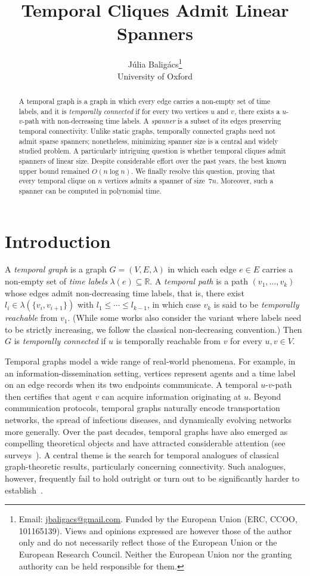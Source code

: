 \documentclass[11pt, letterpaper]{article}
\title{Temporal Cliques Admit Linear Spanners}
\author{Júlia Baligács\thanks{Email: \href{mailto:jbaligacs@gmail.com}{jbaligacs@gmail.com}. Funded by the European Union (ERC, CCOO, 101165139).
Views and opinions expressed are however those of the author only and do not necessarily reflect those of the European Union or the European Research Council. Neither the European Union nor the granting authority can be held responsible for them.}
\vspace{2mm}\\ University of Oxford}
\date{}
\theoremstyle{definition}
\theoremstyle{plain}
\begin{document}
\maketitle


\begin{abstract}
A temporal graph is a graph in which every edge carries a non-empty set of time labels, and it is \emph{temporally connected} if for every two vertices $u$ and $v$, there exists a $u$-$v$-path with non-decreasing time labels. A \emph{spanner} is a subset of its edges preserving temporal connectivity.
Unlike static graphs, temporally connected graphs need not admit sparse spanners; nonetheless, minimizing spanner size is a central and widely studied problem.
A particularly intriguing question is whether temporal cliques admit spanners of linear size.
Despite considerable effort over the past years, the best known upper bound remained $O(n \log n)$.
We finally resolve this question, proving that every temporal clique on $n$ vertices admits a spanner of size~$7n$.
Moreover, such a spanner can be computed in polynomial time.
\end{abstract}



\section{Introduction}

A \emph{temporal graph} is a graph $G=(V,E,\lambda)$ in which each edge $e\in E$
carries a non-empty set of \emph{time labels} $\lambda(e)\subseteq\mathbb{R}$.
A \emph{temporal path} is a path $(v_1,\dots,v_k)$ whose edges admit non-decreasing time labels, that is, there exist~$l_i\in\lambda(\{v_i,v_{i+1}\})$ with $l_1\leq\cdots\leq l_{k-1}$, in which case $v_k$ is said to be \emph{temporally reachable} from $v_1$.
(While some works also consider the variant where labels need to be strictly increasing, we follow the classical non-decreasing convention.)
Then $G$ is \emph{temporally connected} if $u$ is temporally reachable from $v$ for every $u,v\in V$.

Temporal graphs model a wide range of real-world phenomena.
For example, in an information-dissemination setting, vertices represent agents and a time label on an edge records when its two endpoints communicate. 
A temporal $u$-$v$-path then certifies that agent $v$ can acquire information originating at $u$.
Beyond communication protocols, temporal graphs naturally encode transportation networks, the spread of infectious diseases, and dynamically evolving networks more generally.
Over the past decades, temporal graphs have also emerged as compelling theoretical objects and have attracted considerable attention (see surveys~\cite{Michail16, CasteigtsSurvey}).
A central theme is the search for temporal analogues of classical graph-theoretic results, particularly concerning connectivity.
Such analogues, however, frequently fail to hold outright or turn out to be significantly harder to establish~\cite{AkridaTVC18, Mertzios23,CasteigtsWaiting21,ZschocheJCSS20}.
\end{document}
